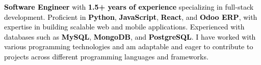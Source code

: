 
{\parskip=0pt
\noindent
\textcolor{black}{
\textbf{Software Engineer} with \textbf{1.5+ years of experience} specializing in full-stack development. Proficient in \textbf{Python}, \textbf{JavaScript}, \textbf{React}, and \textbf{Odoo ERP}, with expertise in building scalable web and mobile applications. Experienced with databases such as \textbf{MySQL}, \textbf{MongoDB}, and \textbf{PostgreSQL}. I have worked with various programming technologies and am adaptable and eager to contribute to projects across different programming languages and frameworks.
}
}


